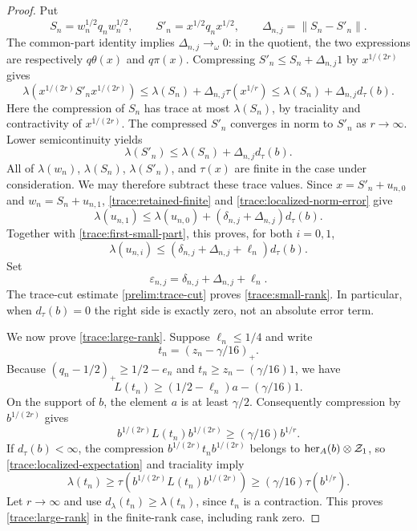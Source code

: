 \begin{proof}
Put
\[
 S_n=w_n^{1/2}q_nw_n^{1/2},\qquad
 S'_n=x^{1/2}q_nx^{1/2},\qquad
 \Delta_{n,j}=\|S_n-S'_n\|.
\]
The common-part identity implies
$\Delta_{n,j}\to_\omega0$: in the quotient, the two expressions
are respectively $q\theta(x)$ and $q\pi(x)$.
Compressing $S'_n\leq S_n+\Delta_{n,j}1$ by $x^{1/(2r)}$ gives
\[
 \lambda(x^{1/(2r)}S'_nx^{1/(2r)})
 \leq\lambda(S_n)+\Delta_{n,j}\tau(x^{1/r})
 \leq\lambda(S_n)+\Delta_{n,j}d_\tau(b).
\]
Here the compression of $S_n$ has trace at most $\lambda(S_n)$,
by traciality and contractivity of $x^{1/(2r)}$.
The compressed $S'_n$ converges in norm to $S'_n$ as $r\to\infty$.
Lower semicontinuity yields
\begin{equation}\label{trace:localized-norm-error}
 \lambda(S'_n)\leq\lambda(S_n)+\Delta_{n,j}d_\tau(b).
\end{equation}
All of $\lambda(w_n)$, $\lambda(S_n)$, $\lambda(S'_n)$, and
$\tau(x)$ are finite in the case under consideration.  We may
therefore subtract these trace values.  Since
$x=S'_n+u_{n,0}$ and $w_n=S_n+u_{n,1}$,
\eqref{trace:retained-finite} and
\eqref{trace:localized-norm-error} give
\[
 \lambda(u_{n,1})
 \leq\lambda(u_{n,0})
       +(\delta_{n,j}+\Delta_{n,j})d_\tau(b).
\]
Together with \eqref{trace:first-small-part}, this proves, for both
$i=0,1$,
\[
 \lambda(u_{n,i})
 \leq(\delta_{n,j}+\Delta_{n,j}+\ell_n)d_\tau(b).
\]
Set
\begin{equation}\label{trace:error-coefficient}
 \varepsilon_{n,j}=\delta_{n,j}+\Delta_{n,j}+\ell_n.
\end{equation}
The trace-cut estimate \eqref{prelim:trace-cut} proves
\eqref{trace:small-rank}.  In particular, when $d_\tau(b)=0$ the
right side is exactly zero, not an absolute error term.

We now prove \eqref{trace:large-rank}.  Suppose $\ell_n\leq1/4$ and
write
\[
 t_n=(z_n-\gamma/16)_+.
\]
Because $(q_n-1/2)_+\geq1/2-e_n$ and
$t_n\geq z_n-(\gamma/16)1$, we have
\begin{equation}\label{trace:expectation-lower}
 L(t_n)\geq(1/2-\ell_n)a-(\gamma/16)1.
\end{equation}
On the support of $b$, the element $a$ is at least $\gamma/2$.
Consequently compression by $b^{1/(2r)}$ gives
\begin{equation}\label{trace:compressed-lower}
 b^{1/(2r)}L(t_n)b^{1/(2r)}
 \geq(\gamma/16)b^{1/r}.
\end{equation}
If $d_\tau(b)<\infty$, the compression
$b^{1/(2r)}t_nb^{1/(2r)}$ belongs to
$\operatorname{her}_A(b)\otimes\mathcal Z_1$, so
\eqref{trace:localized-expectation} and traciality imply
\[
 \lambda(t_n)
 \geq\tau(b^{1/(2r)}L(t_n)b^{1/(2r)})
 \geq(\gamma/16)\tau(b^{1/r}).
\]
Let $r\to\infty$ and use
$d_\lambda(t_n)\geq\lambda(t_n)$, since $t_n$ is a contraction.
This proves \eqref{trace:large-rank} in the finite-rank case,
including rank zero.


\end{proof}
